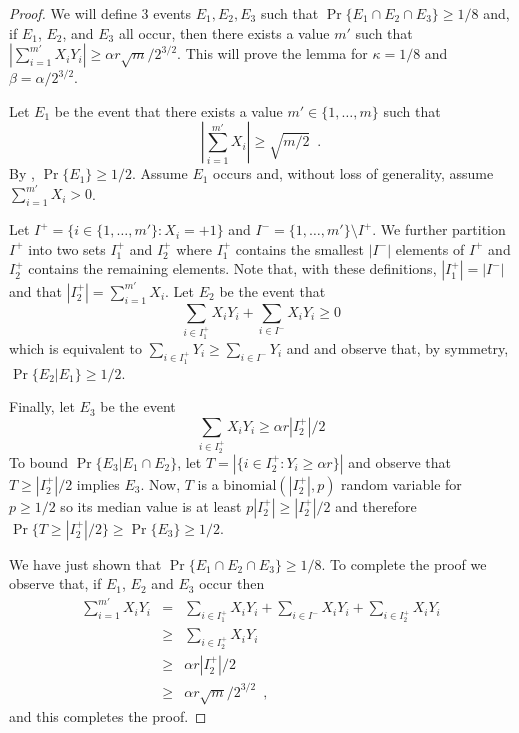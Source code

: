 \documentclass[lotsofwhite]{patmorin}
\begin{document}
\begin{proof}
We will define 3 events $E_1,E_2,E_3$ such that
$\Pr\{E_1\cap E_2\cap E_3\} \ge 1/8$ and, if $E_1$, $E_2$, and $E_3$
all occur, then there exists a value $m'$ such that
$\left|\sum_{i=1}^{m'}
X_iY_i\right| \ge \alpha r \sqrt{m}/2^{3/2}$.  This will prove the
lemma for $\kappa = 1/8$ and $\beta = \alpha/2^{3/2}$.

Let $E_1$ be the event that there exists a value $m'\in\{1,\ldots,m\}$
such that 
\[
   \left|\sum_{i=1}^{m'} X_i\right| \ge \sqrt{m/2} \enspace .
\]
By , $\Pr\{E_1\}\ge 1/2$.  Assume $E_1$ occurs
and, without loss of generality, assume $\sum_{i=1}^{m'} X_i > 0$.

Let $I^{+} = \{i\in\{1,\ldots,m'\}: X_i=+1\}$ and
$I^-=\{1,\ldots,m'\}\setminus I^+$.  We further partition $I^+$ into
two sets $I^+_1$ and $I^+_2$ where $I^+_1$ contains the smallest
$|I^-|$ elements of $I^+$ and $I^+_2$ contains the remaining elements.
Note that, with these definitions, $|I^+_1|=|I^-|$ and that
$|I^+_2|=\sum_{i=1}^{m'} X_i$.  Let $E_2$ be the event that
\[
     \sum_{i\in I^+_1}X_iY_i + \sum_{i\in I^-} X_iY_i \ge 0
\]
which is equivalent to $\sum_{i\in I^+_1}Y_i \ge \sum_{i\in I^-} Y_i$
and and observe that, by symmetry, $\Pr\{E_2|E_1\}\ge 1/2$.

Finally, let $E_3$ be the event
\[
   \sum_{i\in I^+_2} X_iY_i \ge \alpha r|I^+_2|/2
\]
To bound $\Pr\{E_3|E_1\cap E_2\}$, let $T=|\{i\in I^+_2:Y_i\ge \alpha r\}|$ and observe that
$T\ge |I^+_2|/2$ implies $E_3$. Now, $T$ is a
$\mathrm{binomial}(|I^+_2|,p)$ random variable for $p\ge 1/2$ so its
median value is at least $p|I^+_2| \ge |I^+_2|/2$ and therefore
$\Pr\{T\ge |I^+_2|/2\} \ge \Pr\{E_3\} \ge 1/2$.

We have just shown that $\Pr\{E_1\cap E_2\cap E_3\}\ge 1/8$.  To
complete the proof we observe that, if $E_1$, $E_2$ and $E_3$ occur
then
\begin{eqnarray}
  \sum_{i=1}^{m'} X_i Y_i 
    & = & \sum_{i\in I^+_1} X_i Y_i
           + \sum_{i\in I^-} X_i Y_i 
           + \sum_{i\in I^+_2} X_i Y_i \\
    & \ge & \sum_{i\in I^+_2} X_i Y_i \\
    & \ge & \alpha r|I^+_2|/2 \\
    & \ge & \alpha r\sqrt{m}/2^{3/2} \enspace ,
\end{eqnarray}
and this completes the proof.
\end{proof}
\end{document}
